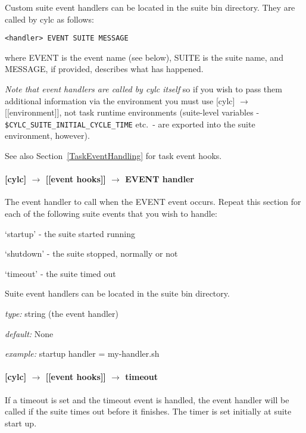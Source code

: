 Custom suite event handlers can be located in the suite bin directory.
They are called by cylc as follows:
\begin{lstlisting}
<handler> EVENT SUITE MESSAGE
\end{lstlisting}
where EVENT is the event name (see below), SUITE is the suite name, and 
MESSAGE, if provided, describes what has happened.

{\em Note that event handlers are called by cylc itself} so if you wish
to pass them additional information via the environment you must use
[cylc] $\rightarrow$ [[environment]], not task runtime environments
(suite-level variables - \lstinline=$CYLC_SUITE_INITIAL_CYCLE_TIME=
etc.\ - are exported into the suite environment, however).

See also Section~\ref{TaskEventHandling} for task event hooks.

\paragraph[script]{[cylc] $\rightarrow$ [[event hooks]] $\rightarrow$ EVENT handler}

The event handler to call when the EVENT event occurs. Repeat this
section for each of the following suite events that you wish to handle:
\begin{myitemize}
    \item `startup' - the suite started running 
    \item `shutdown' - the suite stopped, normally or not
    \item `timeout' - the suite timed out
\end{myitemize}

Suite event handlers can be located in the suite bin directory.
\begin{myitemize}
    \item {\em type:} string (the event handler)
    \item {\em default:} None
    \item {\em example:} startup handler = my-handler.sh
\end{myitemize}

\paragraph[timeout]{[cylc] $\rightarrow$ [[event hooks]] $\rightarrow$ timeout}

If a timeout is set and the timeout event is handled, the event
handler will be called if the suite times out before it finishes.
The timer is set initially at suite start up. 

